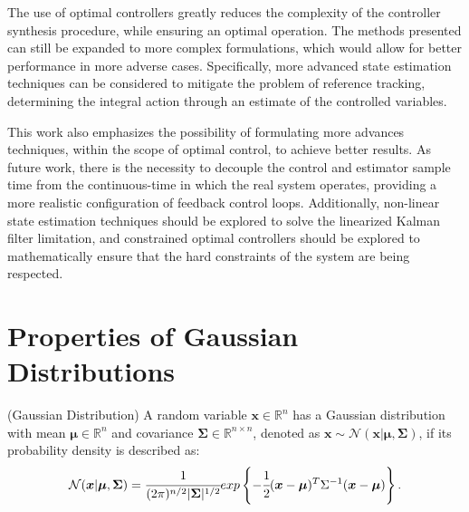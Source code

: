 \documentclass[a4paper,11pt]{book}
\numberwithin{figure}{chapter}
\numberwithin{equation}{chapter}
\numberwithin{table}{chapter}
\theoremstyle{definition}
\newtheorem{definition}{Definition}[chapter]
\newcounter{boxed-theorem}
\newcounter{boxed-lemma}
\newcounter{boxed-definition}
\newenvironment{boxed-definition}[1]
{\colorlet{shadecolor}{pastelYellow!15} \begin{shaded} \begin{definition}{#1}}
{\end{definition} \end{shaded}}
\newcounter{boxed-example}
\begin{document}
The use of optimal controllers greatly reduces the complexity of the controller synthesis procedure, while ensuring an optimal operation. The methods presented can still be expanded to more complex formulations, which would allow for better performance in more adverse cases. Specifically, more advanced state estimation techniques can be considered to mitigate the problem of reference tracking, determining the integral action through an estimate of the controlled variables.

This work also emphasizes the possibility of formulating more advances techniques, within the scope of optimal control, to achieve better results. As future work, there is the necessity to decouple the control and estimator sample time from the continuous-time in which the real system operates, providing a more realistic configuration of feedback control loops. Additionally, non-linear state estimation techniques should be explored to solve the linearized Kalman filter limitation, and constrained optimal controllers should be explored to mathematically ensure that the hard constraints of the system are being respected.

\clearpage
{}




\clearpage
\appendix
\chapter{Properties of Gaussian Distributions}

\begin{boxed-definition}{(Gaussian Distribution)} \label{def:gauss}
	A random variable $\bm{x} \in \mathbb{R}^n$ has a Gaussian distribution with mean $\bm{\mu} \in \mathbb{R}^n$ and covariance $\bm{\Sigma} \in \mathbb{R}^{n \times n}$, denoted as $\bm{x} \sim \mathcal{N}(\bm{x}|\bm{\mu}, \bm{\Sigma})$, if its probability density is described as:
	\begin{equation}
		\mathcal{N}(\bm{x}|\bm{\mu}, \bm{\Sigma}) = \cfrac{1}{(2\pi)^{n/2} | \bm{\Sigma} |^{1/2}} exp \left\{-\cfrac{1}{2} (\bm{x} - \bm{\mu})^T \Sigma^{-1} (\bm{x} - \bm{\mu}) \right\}
	.\end{equation}
\end{boxed-definition}
\end{document}
